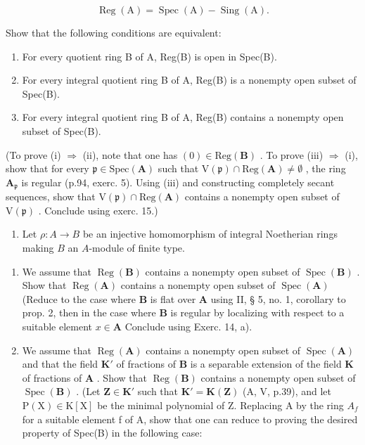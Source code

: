 \[
\operatorname{Reg} (\mathrm{A}) = \operatorname{Spec} (\mathrm{A}) - \operatorname{Sing} (\mathrm{A}).
\]

Show that the following conditions are equivalent:

\begin{enumerate}
\def\labelenumi{(\roman{enumi})}
\item
  For every quotient ring B of A, Reg(B) is open in Spec(B).
\item
  For every integral quotient ring B of A, Reg(B) is a nonempty open subset of Spec(B).
\item
  For every integral quotient ring B of A, Reg(B) contains a nonempty open subset of Spec(B).
\end{enumerate}

(To prove (i) \(\Rightarrow\) (ii), note that one has \((0)\in\mathrm{Reg}(\mathbf{B})\) . To prove (iii) \(\Rightarrow\) (i), show that for every \(\mathfrak{p}\in\mathrm{Spec}(\mathbf{A})\) such that \(\mathrm{V}(\mathfrak{p})\cap\mathrm{Reg}(\mathbf{A})\neq\emptyset\) , the ring \(\mathbf{A}_{\mathfrak{p}}\) is regular (p.94, exerc. 5). Using (iii) and constructing completely secant sequences, show that \(\mathrm{V}(\mathfrak{p})\cap\mathrm{Reg}(\mathbf{A})\) contains a nonempty open subset of \(\mathrm{V}(\mathfrak{p})\) . Conclude using exerc. 15.)

\begin{enumerate}
\def\labelenumi{\arabic{enumi})}
\setcounter{enumi}{16}
\tightlist
\item
  Let \(\rho: A \to B\) be an injective homomorphism of integral Noetherian rings making \(B\) an \(A\)-module of finite type.
\end{enumerate}

\begin{enumerate}
\def\labelenumi{\alph{enumi})}
\item
  We assume that \(\operatorname{Reg}(\mathbf{B})\) contains a nonempty open subset of \(\operatorname{Spec}(\mathbf{B})\) . Show that \(\operatorname{Reg}(\mathbf{A})\) contains a nonempty open subset of \(\operatorname{Spec}(\mathbf{A})\) (Reduce to the case where \(\mathbf{B}\) is flat over \(\mathbf{A}\) using II, § 5, no. 1, corollary to prop. 2, then in the case where \(\mathbf{B}\) is regular by localizing with respect to a suitable element \(x \in \mathbf{A}\) Conclude using Exerc. 14, a).
\item
  We assume that \(\operatorname{Reg}(\mathbf{A})\) contains a nonempty open subset of \(\operatorname{Spec}(\mathbf{A})\) and that the field \(\mathbf{K}'\) of fractions of \(\mathbf{B}\) is a separable extension of the field \(\mathbf{K}\) of fractions of \(\mathbf{A}\) . Show that \(\operatorname{Reg}(\mathbf{B})\) contains a nonempty open subset of \(\operatorname{Spec}(\mathbf{B})\) . (Let \(\mathbf{Z} \in \mathbf{K}'\) such that \(\mathbf{K}' = \mathbf{K}(\mathbf{Z})\) (A, V, p.39), and let \(\mathrm{P}(\mathrm{X}) \in \mathrm{K}[\mathrm{X}]\) be the minimal polynomial of Z. Replacing A by the ring \(A_{f}\) for a suitable element f of A, show that one can reduce to proving the desired property of Spec(B) in the following case:
\end{enumerate}


